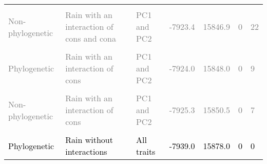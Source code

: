 \documentclass[
  12pt,
  letterpaper,
  DIV=11,
  numbers=noendperiod]{scrartcl}
\begin{document}
\begin{table}[H]
{\begin{tabular}[t]{lllllll}
\cellcolor{gray!6}{\textcolor{gray}{Non-phylogenetic}} & \cellcolor{gray!6}{\textcolor{gray}{Rain with an interaction of cona}} & \cellcolor{gray!6}{\textcolor{gray}{PC1 and PC2}} & \cellcolor{gray!6}{\textcolor{gray}{-7923.3}} & \cellcolor{gray!6}{\textcolor{gray}{15846.6}} & \cellcolor{gray!6}{\textcolor{gray}{0}} & \cellcolor{gray!6}{\textcolor{gray}{11}}\\
\textcolor{gray}{Non-phylogenetic} & \textcolor{gray}{Rain with an interaction of cons and cona} & \textcolor{gray}{PC1 and PC2} & \textcolor{gray}{-7923.4} & \textcolor{gray}{15846.9} & \textcolor{gray}{0} & \textcolor{gray}{22}\\
\cellcolor{gray!6}{\textcolor{gray}{Non-phylogenetic}} & \cellcolor{gray!6}{\textcolor{gray}{Rain with all the interactions}} & \cellcolor{gray!6}{\textcolor{gray}{PC1 and PC2}} & \cellcolor{gray!6}{\textcolor{gray}{-7923.6}} & \cellcolor{gray!6}{\textcolor{gray}{15847.3}} & \cellcolor{gray!6}{\textcolor{gray}{0}} & \cellcolor{gray!6}{\textcolor{gray}{5}}\\
\textcolor{gray}{Phylogenetic} & \textcolor{gray}{Rain with an interaction of cons} & \textcolor{gray}{PC1 and PC2} & \textcolor{gray}{-7924.0} & \textcolor{gray}{15848.0} & \textcolor{gray}{0} & \textcolor{gray}{9}\\
\addlinespace
\cellcolor{gray!6}{\textcolor{gray}{Non-phylogenetic}} & \cellcolor{gray!6}{\textcolor{gray}{No rain}} & \cellcolor{gray!6}{\textcolor{gray}{PC1 and PC2}} & \cellcolor{gray!6}{\textcolor{gray}{-7924.9}} & \cellcolor{gray!6}{\textcolor{gray}{15849.8}} & \cellcolor{gray!6}{\textcolor{gray}{0}} & \cellcolor{gray!6}{\textcolor{gray}{65}}\\
\textcolor{gray}{Non-phylogenetic} & \textcolor{gray}{Rain with an interaction of cons} & \textcolor{gray}{PC1 and PC2} & \textcolor{gray}{-7925.3} & \textcolor{gray}{15850.5} & \textcolor{gray}{0} & \textcolor{gray}{7}\\
\cellcolor{gray!6}{\textcolor{black}{Phylogenetic}} & \cellcolor{gray!6}{\textcolor{black}{No rain}} & \cellcolor{gray!6}{\textcolor{black}{All traits}} & \cellcolor{gray!6}{\textcolor{black}{-7938.6}} & \cellcolor{gray!6}{\textcolor{black}{15877.1}} & \cellcolor{gray!6}{\textcolor{black}{0}} & \cellcolor{gray!6}{\textcolor{black}{0}}\\
\textcolor{black}{Phylogenetic} & \textcolor{black}{Rain without interactions} & \textcolor{black}{All traits} & \textcolor{black}{-7939.0} & \textcolor{black}{15878.0} & \textcolor{black}{0} & \textcolor{black}{0}\\

\end{tabular}}
\end{table}
\end{document}
